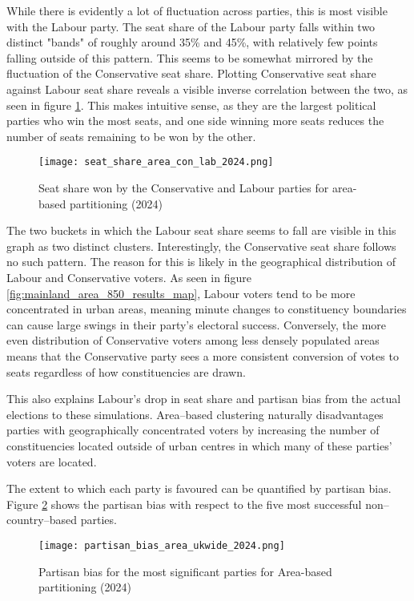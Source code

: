 \documentclass{article}
\begin{document}
While there is evidently a lot of fluctuation across parties, this is most visible with the Labour party. The seat share of the Labour party falls within 
two distinct "bands" of roughly around 35\% and 45\%, with relatively few points falling outside of this pattern. This seems to be somewhat mirrored by the
fluctuation of the Conservative seat share. Plotting Conservative seat share against Labour seat share reveals a visible inverse correlation
between the two, as seen in figure \ref{fig:seat_share_area_con_lab_2024}. This makes intuitive sense, as they are the largest political parties who win the most seats, and one side winning more seats reduces the 
number of seats remaining to be won by the other.

\begin{figure}[H]
    \centering
    \texttt{[image: seat\_share\_area\_con\_lab\_2024.png]}
    \caption{Seat share won by the Conservative and Labour parties for area-based partitioning (2024)}
    \label{fig:seat_share_area_con_lab_2024}
\end{figure}

The two buckets in which the Labour seat share seems to fall are visible in this graph as two distinct clusters. Interestingly, the Conservative seat share
follows no such pattern. The reason for this is likely in the geographical distribution of Labour and Conservative voters. As seen in figure \ref{fig:mainland_area_850_results_map},
Labour voters tend to be more concentrated in urban areas, meaning minute changes to constituency boundaries can cause large swings in their party's electoral success. Conversely, the more even distribution
of Conservative voters among less densely populated areas means that the Conservative party sees a more consistent conversion of votes to seats regardless of
how constituencies are drawn.

This also explains Labour's drop in seat share and partisan bias from the actual elections to these simulations. Area--based clustering naturally disadvantages parties with geographically concentrated
voters by increasing the number of constituencies located outside of urban centres in which many of these parties' voters are located.

The extent to which each party is favoured can be quantified by partisan bias. Figure \ref{fig:partisan_bias_area_ukwide_2024} shows the partisan bias with respect to the five most successful
non--country--based parties.
\begin{figure}[H]
    \centering
    \texttt{[image: partisan\_bias\_area\_ukwide\_2024.png]}
    \caption{Partisan bias for the most significant parties for Area-based partitioning (2024)}
    \label{fig:partisan_bias_area_ukwide_2024}
\end{figure}
\end{document}
